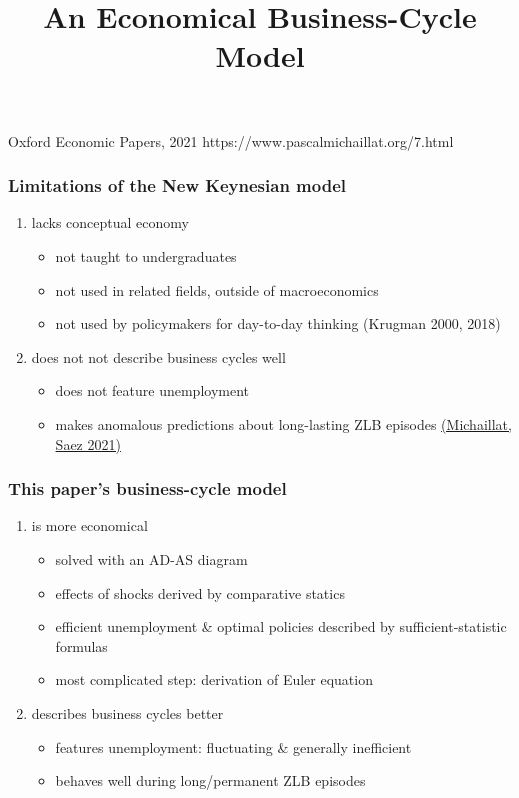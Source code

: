 \documentclass[12pt,xcolor={dvipsnames},hyperref={pdftex,pdfpagemode=UseNone,hidelinks,pdfdisplaydoctitle=true},usepdftitle=false]{beamer}
\begin{document}
\title{An Economical Business-Cycle Model}
%
{Oxford Economic Papers, 2021}%
{https://www.pascalmichaillat.org/7.html}
\frame[plain]{\titlepage}

\begin{frame}
\frametitle{Limitations of the New Keynesian model}
\begin{enumerate}
\item lacks conceptual economy
\begin{itemize}
\item not taught to undergraduates
\item not used in related fields, outside of macroeconomics
\item not used by policymakers for day-to-day thinking (Krugman 2000, 2018)
\end{itemize}
\item does not not describe business cycles well
\begin{itemize}
\item does not feature unemployment
\item makes anomalous predictions about long-lasting ZLB episodes \href{https://www.pascalmichaillat.org/11.html}{(Michaillat, Saez 2021)}
\end{itemize}
\end{enumerate}
\end{frame}

\begin{frame}
\frametitle{This paper's business-cycle model}
\begin{enumerate}
\item is more economical
\begin{itemize}
\item solved with an AD-AS diagram
\item effects of shocks derived by comparative statics
\item efficient unemployment \& optimal policies described by sufficient-statistic formulas
\item most complicated step: derivation of Euler equation
\end{itemize}
\item describes business cycles better
\begin{itemize}
\item features unemployment: fluctuating \& generally inefficient
\item behaves well during long/permanent ZLB episodes
\end{itemize}
\end{enumerate}
\end{frame}
\end{document}
